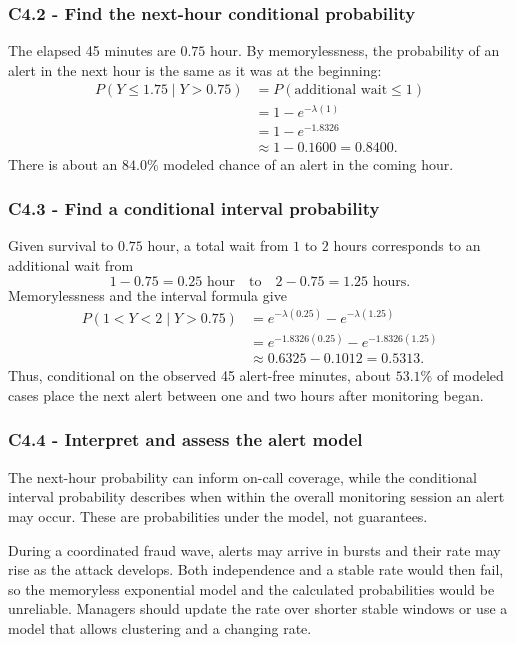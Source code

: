 \subsubsection*{C4.2 - Find the next-hour conditional probability}\label{subsec:c4-applied-wallet-b}
The elapsed 45 minutes are $0.75$ hour.  By memorylessness, the probability of
an alert in the next hour is the same as it was at the beginning:
\[
\begin{aligned}
 P(Y\leq1.75\mid Y>0.75)
 &=P(\text{additional wait}\leq1)\\
 &=1-e^{-\lambda(1)}\\
 &=1-e^{-1.8326}\\
 &\approx1-0.1600=0.8400.
\end{aligned}
\]
There is about an $84.0\%$ modeled chance of an alert in the coming hour.

\subsubsection*{C4.3 - Find a conditional interval probability}\label{subsec:c4-applied-wallet-c}
Given survival to $0.75$ hour, a total wait from $1$ to $2$ hours corresponds
to an additional wait from
\[
 1-0.75=0.25\text{ hour}
 \quad\text{to}\quad
 2-0.75=1.25\text{ hours}.
\]
Memorylessness and the interval formula give
\[
\begin{aligned}
 P(1<Y<2\mid Y>0.75)
 &=e^{-\lambda(0.25)}-e^{-\lambda(1.25)}\\
 &=e^{-1.8326(0.25)}-e^{-1.8326(1.25)}\\
 &\approx0.6325-0.1012=0.5313.
\end{aligned}
\]
Thus, conditional on the observed 45 alert-free minutes, about $53.1\%$ of
modeled cases place the next alert between one and two hours after monitoring
began.

\subsubsection*{C4.4 - Interpret and assess the alert model}\label{subsec:c4-applied-wallet-d}
The next-hour probability can inform on-call coverage, while the conditional
interval probability describes when within the overall monitoring session an
alert may occur.  These are probabilities under the model, not guarantees.

During a coordinated fraud wave, alerts may arrive in bursts and their rate
may rise as the attack develops.  Both independence and a stable rate would
then fail, so the memoryless exponential model and the calculated
probabilities would be unreliable.  Managers should update the rate over
shorter stable windows or use a model that allows clustering and a changing
rate.


